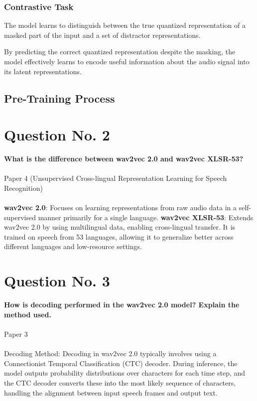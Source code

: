 \documentclass{article}
\begin{document}
\subsubsection{Contrastive Task}

The model learns to distinguish between the true quantized representation of a masked part of the input and a set of distractor representations.

By predicting the correct quantized representation despite the masking, the model effectively learns to encode useful information about the audio signal into its latent representations.

\pagebreak


\subsection*{Pre-Training Process}



\pagebreak

\section*{Question No. 2}
\textbf{What is the difference between wav2vec 2.0 and wav2vec XLSR-53?}\\\\
Paper 4 (Unsupervised Cross-lingual Representation Learning for Speech Recognition)\\\\
\textbf{wav2vec 2.0}: Focuses on learning representations from raw audio data in a self-supervised manner primarily for a single language.
\textbf{wav2vec XLSR-53}: Extends wav2vec 2.0 by using multilingual data, enabling cross-lingual transfer. It is trained on speech from 53 languages, allowing it to generalize better across different languages and low-resource settings.

\pagebreak

\section*{Question No. 3}
\textbf{How is decoding performed in the wav2vec 2.0 model? Explain the method used.}\\\\
Paper 3\\\\
Decoding Method: Decoding in wav2vec 2.0 typically involves using a Connectionist Temporal Classification (CTC) decoder. During inference, the model outputs probability distributions over characters for each time step, and the CTC decoder converts these into the most likely sequence of characters, handling the alignment between input speech frames and output text.
\end{document}
